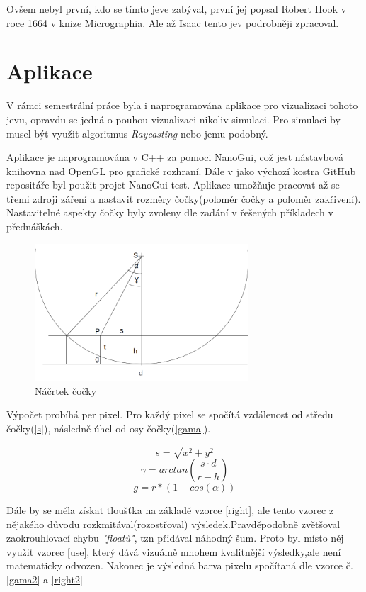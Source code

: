 \documentclass[a4paper, 12pt]{article}
\begin{document}
Ovšem nebyl první, kdo se tímto jeve zabýval, první jej popsal Robert Hook v roce 1664 v knize Micrographia. Ale až Isaac tento jev podrobněji zpracoval.

\section{Aplikace}
V rámci semestrální práce byla i naprogramována aplikace pro vizualizaci tohoto jevu, opravdu se jedná o pouhou vizualizaci nikoliv simulaci. Pro simulaci by musel být využit algoritmus \textit{Raycasting} nebo jemu podobný. 

Aplikace je naprogramována v C++ za pomoci NanoGui\cite{nanogui}, což jest nástavbová knihovna nad OpenGL pro grafické rozhraní. Dále v jako výchozí kostra GitHub repositáře byl použit projet NanoGui-test\cite{nanoguitest}. Aplikace umožňuje pracovat až se třemi zdroji záření a nastavit rozměry čočky(poloměr čočky a poloměr zakřivení). Nastavitelné aspekty čočky byly zvoleny dle zadání v řešených příkladech v přednáškách.
  \begin{figure}
	\begin{center}
		\includegraphics[width=8cm]{len}
		\caption{Náčrtek čočky}
		\label{len}
	\end{center}
\end{figure}
Výpočet probíhá per pixel. Pro každý pixel se spočítá vzdálenost od středu čočky(\ref{s}), následně úhel od osy čočky(\ref{gama}).   
		\begin{center}
	\begin{equation}
	\label{s}
	s = \sqrt{x^2 + y^2 } 	
	\end{equation}
	\begin{equation}
	\label{gama}
	\gamma = arctan(\frac{s \cdot d}{r-h})	
	\end{equation}
	\begin{equation}
	\label{right}
	g = r*(1 - cos(\alpha))	
	\end{equation}
\end{center} 
Dále by se měla získat tloušťka na základě vzorce \ref{right}, ale tento vzorec z nějakého důvodu rozkmitával(rozostřoval) výsledek.Pravděpodobně zvětšoval zaokrouhlovací chybu \textit{"floatů"}, tzn přidával náhodný šum. Proto byl místo něj využit vzorec \ref{use}, který dává vizuálně mnohem kvalitnější výsledky,ale není matematicky odvozen. Nakonec je výsledná barva pixelu spočítaná dle vzorce č. \ref{gama2} a \ref{right2}
\end{document}
